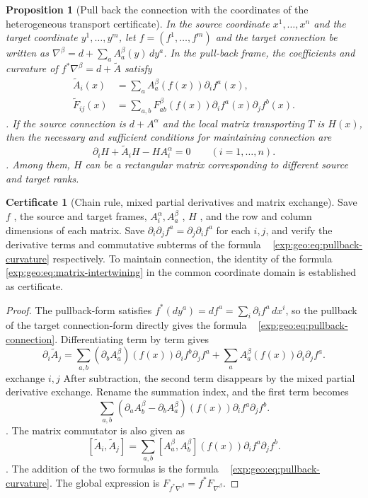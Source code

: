 \documentclass[12pt,a4paper,openany,notitlepage]{report}
\theoremstyle{plain}
\newtheorem{proposition}[theorem]{Proposition}
\theoremstyle{definition}
\newtheorem*{certificate}{Certificate}
\theoremstyle{remark}
\begin{document}
\begin{CJK*}
\begin{proposition}
[Pull back the connection with the coordinates of the heterogeneous transport certificate]\label{exp:geo:prop:pullback-coordinates}
In the source coordinate $x^1,\ldots,x^n$ and the target coordinate $y^1,\ldots,y^m$, let $f=(f^1,\ldots,f^m)$ and the target connection be written as $\nabla^\beta=d+\sum_aA_a^\beta(y)\,dy^a$. In the pull-back frame, the coefficients and curvature of $f^*\nabla^\beta=d+\widetilde A$ satisfy \begin{align}
\label{exp:geo:eq:pullback-connection}
\widetilde A_i(x)&=\sum_aA_a^\beta(f(x))\partial_i f^a(x),\\
\label{exp:geo:eq:pullback-curvature}
\widetilde F_{ij}(x)&=\sum_{a,b}F^\beta_{ab}(f(x))
\partial_i f^a(x)\partial_j f^b(x).
\end{align}. If the source connection is $d+A^\alpha$ and the local matrix transporting $T$ is $H(x)$, then the necessary and sufficient conditions for maintaining connection are \begin{equation}
\label{exp:geo:eq:matrix-intertwining}
\partial_iH+\widetilde A_iH-HA_i^\alpha=0
\qquad(i=1,\ldots,n).
\end{equation}. Among them, $H$ can be a rectangular matrix corresponding to different source and target ranks.\end{proposition}
\begin{certificate}
[Chain rule, mixed partial derivatives and matrix exchange]Save $f$ , the source and target frames, $A_i^\alpha,A_a^\beta$ , $H$ , and the row and column dimensions of each matrix. Save $\partial_i\partial_jf^a=\partial_j\partial_if^a$ for each $i,j$, and verify the derivative terms and commutative subterms of the formula ~ \eqref{exp:geo:eq:pullback-curvature} respectively. To maintain connection, the identity of the formula ~ \eqref{exp:geo:eq:matrix-intertwining} in the common coordinate domain is established as certificate.\end{certificate}
\begin{proof}
The pullback-form satisfies $f^*(dy^a)=df^a=\sum_i\partial_if^a\,dx^i$, so the pullback of the target connection-form directly gives the formula ~ \eqref{exp:geo:eq:pullback-connection}. Differentiating term by term gives \[
\partial_i\widetilde A_j
=\sum_{a,b}(\partial_bA_a^\beta)(f(x))
\partial_if^b\partial_jf^a
+\sum_aA_a^\beta(f(x))\partial_i\partial_jf^a.
\] exchange $i,j$ After subtraction, the second term disappears by the mixed partial derivative exchange. Rename the summation index, and the first term becomes \[
\sum_{a,b}(\partial_aA_b^\beta-\partial_bA_a^\beta)(f(x))
\partial_if^a\partial_jf^b.
\]. The matrix commutator is also given as \[
[\widetilde A_i,\widetilde A_j]
=\sum_{a,b}[A_a^\beta,A_b^\beta](f(x))
\partial_if^a\partial_jf^b.
\]. The addition of the two formulas is the formula ~ \eqref{exp:geo:eq:pullback-curvature}. The global expression is $F_{f^*\nabla^\beta}=f^*F_{\nabla^\beta}$.


\end{proof}
\end{CJK*}
\end{document}
